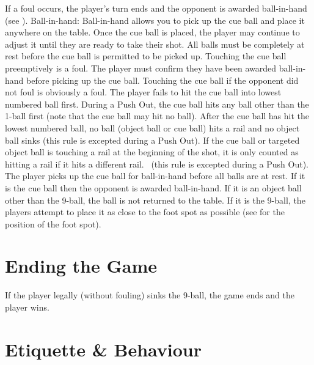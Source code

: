  If a foul occurs, the player's turn ends and the opponent is awarded ball-in-hand (see ).%
Ball-in-hand:
\subruleitem Ball-in-hand allows you to pick up the cue ball and place it anywhere on the table.%
\subruleitem Once the cue ball is placed, the player may continue to adjust it until they are ready to take their shot.%
\subruleitem All balls must be completely at rest before the cue ball is permitted to be picked up. Touching the cue ball preemptively is a foul.%
\subruleitem The player must confirm they have been awarded ball-in-hand before picking up the cue ball. Touching the cue ball if the opponent did not foul is obviously a foul.%
 \FoulsDontStack[9ball]%
 \FoulCircumstances%
\subruleitem The player fails to hit the cue ball into lowest numbered ball first.%
\subruleitem During a Push Out, the cue ball hits any ball other than the 1-ball first (note that the cue ball may hit no ball).
\subruleitem After the cue ball has hit the lowest numbered ball, no ball (object ball or cue ball) hits a rail and no object ball sinks (this rule is excepted during a Push Out).%
\subsubruleitem If the cue ball or targeted object ball is touching a rail at the beginning of the shot, it is only counted as hitting a rail if it hits a different rail.%
\subruleitem \CueBallMiss\ (this rule is excepted during a Push Out).%
\subruleitem \CueBallSink%
\subruleitem \CueBallPreemptive%
\subruleitem The player picks up the cue ball for ball-in-hand before all balls are at rest.%
\subruleitem \ObjectBallTouch[9ball]%
\subruleitem \PushShot%
\subruleitem \BallOffTable%
\subsubruleitem If it is the cue ball then the opponent is awarded ball-in-hand.%
\subsubruleitem If it is an object ball other than the 9-ball, the ball is not returned to the table.%
\subsubruleitem If it is the 9-ball, the players attempt to place it as close to the foot spot as possible (see  for the position of the foot spot).%
\subruleitem \JumpShot%
\subruleitem \TableMovement%
\subruleitem \PoorBehaviour[9ball]%
\IntentionalFoul[9ball]%

\section{Ending the Game} \label{9ball:ending}

 If the player legally (without fouling) sinks the 9-ball, the game ends and the player wins.%
 \IntentionalFoulLoss[9ball]%
 \MisleadingOpponentLoss[9ball]%
 \PoorBehaviorLoss[9ball]%

\section{Etiquette \& Behaviour} \label{9ball:etiquette}

\Misleading%
 \DistractingWhileSettingUp%
 \DistractingWhileStriking%
 \Sportsmanship%
